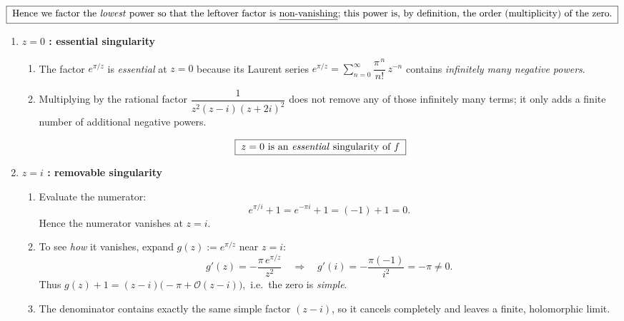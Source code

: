 \documentclass[12pt]{article}
\theoremstyle{definition} %
\theoremstyle{plain} %
\begin{document}
\[
\boxed{\;
\text{Hence we factor the \emph{lowest} power so that the leftover
      factor is \underline{non-vanishing}; this power is, by definition,
      the order (multiplicity) of the zero.}
\;}\]
\pagebreak

\begin{enumerate}[label=\textbf{\arabic*.},leftmargin=*]

  \item \textbf{$z=0$ : essential singularity}
  
  \begin{enumerate}[label=(\alph*)]
  \item The factor $e^{\pi/z}$ is \emph{essential} at $z=0$ because its
        Laurent series
        \(
            e^{\pi/z}=\displaystyle\sum_{n=0}^{\infty}
                       \dfrac{\pi^{\,n}}{n!}\,z^{-n}
        \)
        contains \emph{infinitely many negative powers}.
  \item Multiplying by the rational factor
        $\displaystyle\dfrac{1}{z^{2}(z-i)(z+2i)^{2}}$ 
        does not remove any of those infinitely many terms; it only adds a
        finite number of additional negative powers.
  \end{enumerate}
  
  \[
  \boxed{\;
     z=0 \text{ is an \emph{essential} singularity of } f
   \;}
  \]
  
  \item \textbf{$z=i$ : removable singularity}
  
  \begin{enumerate}[label=(\alph*)]
  \item Evaluate the numerator:
        \[
        e^{\pi/i}+1
        =e^{-\pi i}+1
        =(-1)+1
        =0 .
        \]
        Hence the numerator vanishes at $z=i$.
  \item To see \emph{how} it vanishes, expand
        $g(z):=e^{\pi/z}$ near $z=i$:
        \[
        g'(z)= -\frac{\pi\,e^{\pi/z}}{z^{2}}
        \quad\Longrightarrow\quad
        g'(i)= -\frac{\pi(-1)}{i^{2}}=-\pi\neq0.
        \]
        Thus
        \(
           g(z)+1 = (z-i)\bigl(-\pi+\mathcal O(z-i)\bigr),
        \)
        i.e.\ the zero is \emph{simple}.
  \item The denominator contains exactly the same simple factor
        $(z-i)$, so it cancels completely and leaves a finite,
        holomorphic limit.
  \end{enumerate}
  

\end{enumerate}
\end{document}
